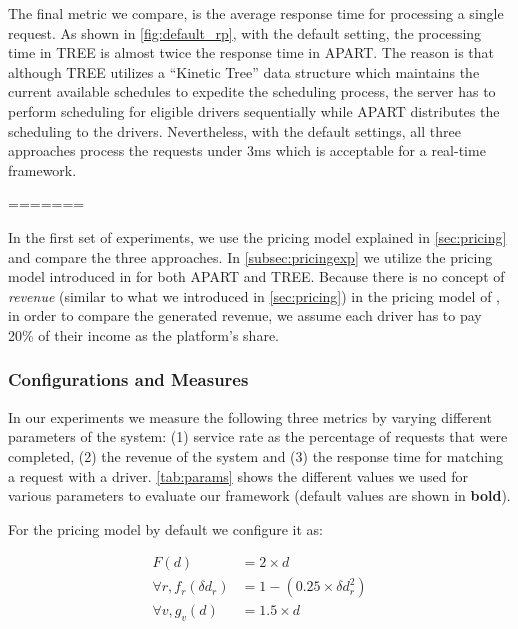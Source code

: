 The final metric we compare, is the average response time for processing a single request. As shown in \cref{fig:default_rp}, with the default setting, the processing time in TREE is almost twice the response time in APART. The reason is that although TREE utilizes a ``Kinetic Tree'' data structure which maintains the current available schedules to expedite the scheduling process, the server has to perform scheduling for eligible drivers sequentially while APART distributes the scheduling to the drivers. Nevertheless, with the default settings, all three approaches process the requests under 3ms which is acceptable for a real-time framework.

=======

In the first set of experiments, we use the pricing model explained in \cref{sec:pricing} and compare the three approaches. In \cref{subsec:pricingexp} we utilize the pricing model introduced in \cite{Ma15} for both APART and TREE. Because there is no concept of \textit{revenue} (similar to what we introduced in \cref{sec:pricing}) in the pricing model of \cite{Ma15}, in order to compare the generated revenue, we assume each driver has to pay 20\% of their income as the platform's share.

\subsubsection{Configurations and Measures}
In our experiments we measure the following three metrics by varying different parameters of the system: (1) service rate as the percentage of requests that were completed, (2) the revenue of the system and (3) the response time for matching a request with a driver. \cref{tab:params} shows the different values we used for various parameters to evaluate our framework (default values are shown in \textbf{bold}).

For the pricing model by default we configure it as:

\begin{equation} \label{eq1}
	\begin{split}
		F(d) & = 2 \times d \\
		\forall r, f_r(\delta d_r) & = 1 - (0.25 \times \delta d_r^2) \\
		\forall v, g_v(d)  & = 1.5 \times d
	\end{split}
\end{equation}


